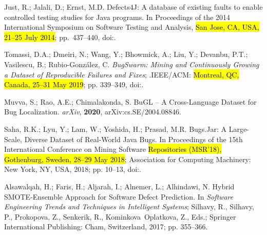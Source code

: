 \documentclass[mathematics,review,accept,moreauthors,pdftex]{Definitions/mdpi}
\begin{document}
\begin{thebibliography}{999}
Just, R.; Jalali, D.; Ernst, M.D.
\newblock Defects4J: A database of existing faults to enable controlled testing
  studies for Java programs.
\newblock  In Proceedings of the 2014 International Symposium on Software Testing
  and Analysis,  \hl{San Jose, CA, USA, 21--25 July 2014}; pp.~437--440,
\newblock
  doi:{\href{https://doi.org/10.1145/2610384.2628055}{}}.  

Tomassi, D.A.; Dmeiri, N.; Wang, Y.; Bhowmick, A.; Liu, Y.; Devanbu, P.T.;
  Vasilescu, B.; Rubio{-}Gonz{\'{a}}lez, C.
\newblock \emph{BugSwarm: Mining and Continuously Growing a Dataset of Reproducible
  Failures and Fixes};
.{IEEE}/{ACM}:  \hl{Montreal, QC, Canada, 25--31 May 2019}; pp. 339--349,
\newblock
  doi:{\href{https://doi.org/10.1109/ICSE.2019.00048}{}}.  

Muvva, S.; Rao, A.E.; Chimalakonda, S.
\newblock BuGL -- A Cross-Language Dataset for Bug Localization.  \emph{arXiv}, \textbf{2020}, arXiv:cs.SE/2004.08846.

Saha, R.K.; Lyu, Y.; Lam, W.; Yoshida, H.; Prasad, M.R.
\newblock Bugs.Jar: A Large-Scale, Diverse Dataset of Real-World Java Bugs.
\newblock  In Proceedings of the 15th International Conference on Mining Software
  \hl{Repositories (MSR'18), Gothenburg, Sweden, 28--29 May 2018}; Association for Computing Machinery: New York, NY, USA,  2018; pp. 10–13,
\newblock
  doi:{\href{https://doi.org/10.1145/3196398.3196473}{}}.

Alsawalqah, H.; Faris, H.; Aljarah, I.; Alnemer, L.; Alhindawi, N.
\newblock Hybrid SMOTE-Ensemble Approach for Software Defect Prediction.
\newblock In \emph{Software Engineering Trends and Techniques in Intelligent Systems};
  Silhavy, R., Silhavy, P., Prokopova, Z., Senkerik, R., Kominkova~Oplatkova,
  Z., Eds.; Springer International Publishing: Cham,  Switzerland, 2017; pp. 355--366.


\end{thebibliography}
\end{document}

